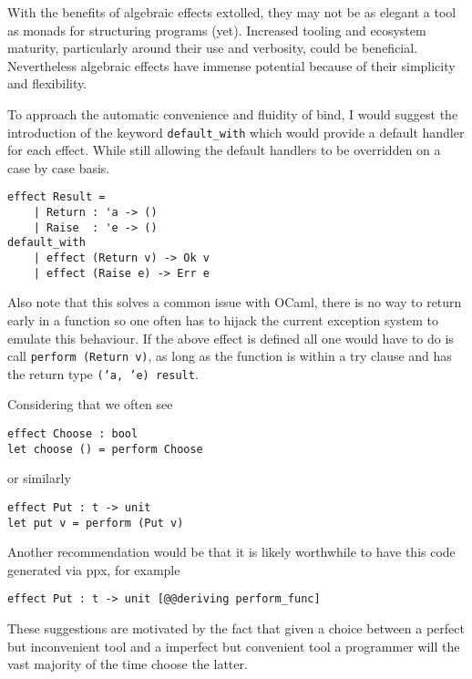 With the benefits of algebraic effects extolled,
they may not be as elegant a tool as monads for structuring programs (yet).
Increased tooling and ecosystem maturity,
particularly around their use and verbosity,
could be beneficial.
Nevertheless algebraic effects
have immense potential because of
their simplicity and flexibility.

To approach the automatic convenience and fluidity of bind,
I would suggest the introduction of the keyword
\texttt{default\_with} which would provide a default
handler for each effect. While still
allowing the default handlers to be overridden
on a case by case basis.
\begin{verbatim}
effect Result =
    | Return : 'a -> ()
    | Raise  : 'e -> ()
default_with
    | effect (Return v) -> Ok v
    | effect (Raise e) -> Err e
\end{verbatim}
Also note that this solves a common issue with
OCaml, there is no way to return early in a function
so one often has to hijack the current exception
system to emulate this behaviour.
If the above effect is defined all one would have
to do is call \texttt{perform (Return v)},
as long as the function is within a try clause and has
the return type \texttt{('a, 'e) result}.

Considering that we often see
\begin{verbatim}
effect Choose : bool
let choose () = perform Choose\end{verbatim}
or similarly
\begin{verbatim}
effect Put : t -> unit
let put v = perform (Put v)
\end{verbatim}
Another recommendation would be that it is likely
worthwhile to have this code generated via ppx, for example
\begin{verbatim}
effect Put : t -> unit [@@deriving perform_func]
\end{verbatim}

These suggestions are motivated by the fact that
given a choice between a perfect but inconvenient tool
and a imperfect but convenient tool
a programmer will the vast majority of the time choose the latter.
